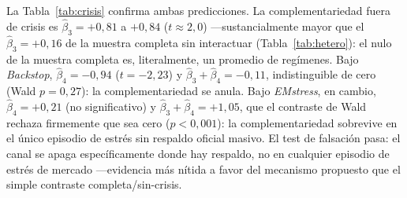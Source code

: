 \begin{table}[t]
\centering\small
{}
\caption[Interacción de crisis: sin botar trimestres]{Ecuación~\eqref{eq:crisisint}, efectos fijos bidireccionales, seis controles domésticos, errores de Driscoll--Kraay. $\hat\beta_3$ es idéntico dentro de cada bloque (mismo término base); se repite por fila para lectura directa de $\hat\beta_3+\hat\beta_4$. Trazabilidad: \texttt{bbg/p9\_crisis\_interaccion.py} = \texttt{bbg/crisis\_interaccion.R} (coinciden a 4 decimales); reproducido también en el notebook Jupyter y en \texttt{analisis\_bloomberg.Rmd}.}
\label{tab:crisis}
\end{table}

La Tabla~\ref{tab:crisis} confirma ambas predicciones. La complementariedad fuera de crisis es $\hat\beta_3=+0{,}81$ a $+0{,}84$ ($t\approx2{,}0$) —sustancialmente mayor que el $\hat\beta_3=+0{,}16$ de la muestra completa sin interactuar (Tabla~\ref{tab:hetero}): el nulo de la muestra completa es, literalmente, un promedio de regímenes. Bajo \textit{Backstop}, $\hat\beta_4=-0{,}94$ ($t=-2{,}23$) y $\hat\beta_3+\hat\beta_4=-0{,}11$, indistinguible de cero (Wald $p=0{,}27$): la complementariedad se anula. Bajo \textit{EMstress}, en cambio, $\hat\beta_4=+0{,}21$ (no significativo) y $\hat\beta_3+\hat\beta_4=+1{,}05$, que el contraste de Wald rechaza firmemente que sea cero ($p<0{,}001$): la complementariedad sobrevive en el único episodio de estrés sin respaldo oficial masivo. El test de falsación pasa: el canal se apaga específicamente donde hay respaldo, no en cualquier episodio de estrés de mercado —evidencia más nítida a favor del mecanismo propuesto que el simple contraste completa/sin-crisis.

